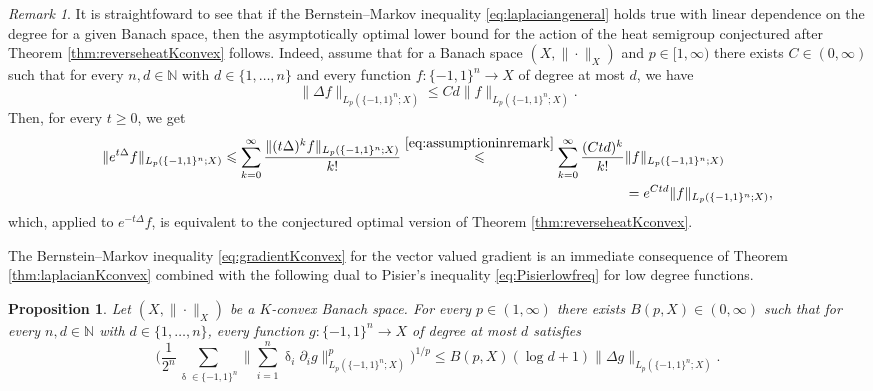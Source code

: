 \documentclass[11pt,reqno]{amsart}
\renewcommand{\leq}{\leqslant}
\renewcommand{\geq}{\geqslant}
\newcommand{\1}{\mathbf 1}
\newtheorem{proposition}[theorem]{Proposition}
\theoremstyle{remark}
\newtheorem{remark}[theorem]{Remark}
\newcommand{\N}{\mathbb N}
\renewcommand{\delta}{\updelta}
\begin{document}
\begin{remark} \label{rem:laplacianimpliesreverseheat}
It is straightfoward to see that if the Bernstein--Markov inequality \eqref{eq:laplaciangeneral} holds true with linear dependence on the degree for a given Banach space, then the asymptotically optimal lower bound for the action of the heat semigroup conjectured after Theorem \ref{thm:reverseheatKconvex} follows. Indeed, assume that for a Banach space $(X,\|\cdot\|_X)$ and $p\in[1,\infty)$ there exists $C\in(0,\infty)$ such that for every $n,d\in\N$ with $d\in\{1,\ldots,n\}$ and every function $f:\{-1,1\}^n\to X$ of degree at most $d$, we have
\begin{equation} \label{eq:assumptioninremark}
 \|\Delta f\|_{L_p(\{-1,1\}^n;X)}  \leq Cd  \|f\|_{L_p(\{-1,1\}^n;X)}.
\end{equation}
Then, for every $t\geq0$, we get
\begin{equation} \label{eq:franc}
\begin{split}
\|e^{t\Delta} f\|_{L_p(\{-1,1\}^n;X)} \leq \sum_{k=0}^\infty \frac{\|(t\Delta)^k f\|_{L_p(\{-1,1\}^n;X)}}{k!} \stackrel{\eqref{eq:assumptioninremark}}{\leq} \sum_{k=0}^\infty \frac{(Ctd)^k}{k!} & \|f\|_{L_p(\{-1,1\}^n;X)} \\ & = e^{Ctd}\|f\|_{L_p(\{-1,1\}^n;X)},
\end{split}
\end{equation}
which, applied to $e^{-t\Delta}f$, is equivalent to the conjectured optimal version of Theorem \ref{thm:reverseheatKconvex}.
\end{remark}

The Bernstein--Markov inequality \eqref{eq:gradientKconvex} for the vector valued gradient is an immediate consequence of Theorem \ref{thm:laplacianKconvex} combined with the following dual to Pisier's inequality \eqref{eq:Pisierlowfreq} for low degree functions.

\begin{proposition}
Let $(X,\|\cdot\|_X)$ be a $K$-convex Banach space. For every $p\in(1,\infty)$ there exists $B(p,X)\in(0,\infty)$ such that for every $n,d\in\N$ with $d\in\{1,\ldots,n\}$, every function $g:\{-1,1\}^n\to X$ of degree at most $d$ satisfies
\begin{equation} \label{eq:dualpisier}
\Big(\frac{1}{2^n}\sum_{\delta\in\{-1,1\}^n} \Big\| \sum_{i=1}^n\delta_i\partial_i g\Big\|^p_{L_p(\{-1,1\}^n;X)} \Big)^{1/p} \leq B(p,X)(\log d+1) \|\Delta g\|_{L_p(\{-1,1\}^n;X)}.
\end{equation}
\end{proposition}
\end{document}
